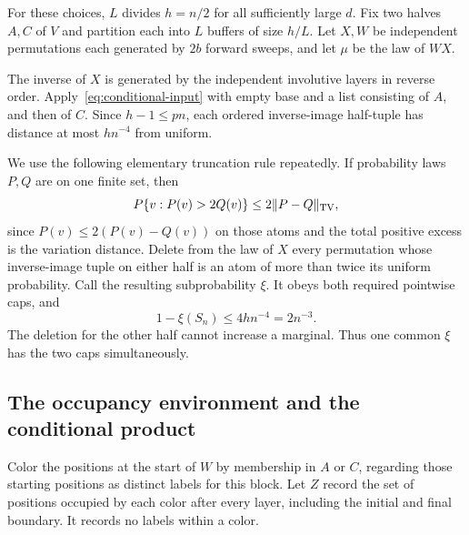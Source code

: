 For these choices, $L$ divides $h=n/2$ for all sufficiently large $d$. Fix two halves $A,C$ of $V$ and partition each into $L$ buffers of size $h/L$. Let $X,W$ be independent permutations each generated by $2b$ forward sweeps, and let $\mu$ be the law of $WX$.

The inverse of $X$ is generated by the independent involutive layers in reverse order. Apply~\eqref{eq:conditional-input} with empty base and a list consisting of $A$, and then of $C$. Since $h-1\le pn$, each ordered inverse-image half-tuple has distance at most $h n^{-4}$ from uniform.

We use the following elementary truncation rule repeatedly. If probability laws $P,Q$ are on one finite set, then
\[
 P\{v:P(v)>2Q(v)\}\le2\|P-Q\|_{\mathrm{TV}},
\]
since $P(v)\le2(P(v)-Q(v))$ on those atoms and the total positive excess is the variation distance. Delete from the law of $X$ every permutation whose inverse-image tuple on either half is an atom of more than twice its uniform probability. Call the resulting subprobability $\xi$. It obeys both required pointwise caps, and
\begin{equation}\label{eq:x-mass}
 1-\xi(S_n)\le4h n^{-4}=2n^{-3}.
\end{equation}
The deletion for the other half cannot increase a marginal. Thus one common $\xi$ has the two caps simultaneously.

\subsection{The occupancy environment and the conditional product}

Color the positions at the start of $W$ by membership in $A$ or $C$, regarding those starting positions as distinct labels for this block. Let $Z$ record the set of positions occupied by each color after every layer, including the initial and final boundary. It records no labels within a color.


